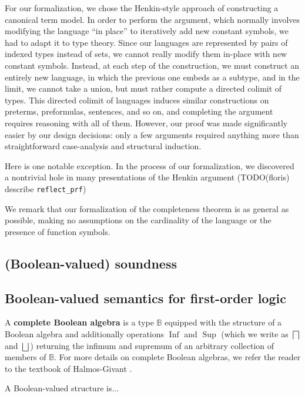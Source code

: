 \documentclass[a4paper,USenglish,cleveref, autoref]{lipics-v2019}
\newcommand{\B}{\mathbb{B}}
\begin{document}
For our formalization, we chose the Henkin-style approach of constructing a canonical term model. In order to perform the argument, which normally involves modifying the language ``in place'' to iteratively add new constant symbols, we had to adapt it to type theory. Since our languages are represented by pairs of indexed types instead of sets, we cannot really modify them in-place with new constant symbols. Instead, at each step of the construction, we must construct an entirely new language, in which the previous one embeds as a subtype, and in the limit, we cannot take a union, but must rather compute a directed colimit of types. This directed colimit of languages induces similar constructions on preterms, preformulas, sentences, and so on, and completing the argument requires reasoning with all of them. However, our proof was made significantly easier by our design decisions: only a few arguments required anything more than straightforward case-analysis and structural induction.

Here is one notable exception. In the process of our formalization, we discovered a nontrivial hole in many presentations of the Henkin argument (TODO(floris) describe \lstinline{reflect_prf})

We remark that our formalization of the completeness theorem is as general as possible, making no assumptions on the cardinality of the language or the presence of function symbols.

\subsection{(Boolean-valued) soundness}
\subsection{Boolean-valued semantics for first-order logic}

A \textbf{complete Boolean algebra} is a type $\B$ equipped with the structure of a Boolean algebra and additionally operations $\operatorname{Inf}$ and $\operatorname{Sup}$ (which we write as $\bigsqcap$ and $\bigsqcup$) returning the infimum and supremum of an arbitrary collection of members of $\B$. For more details on complete Boolean algebras, we refer the reader to the textbook of Halmos-Givant \cite{halmos-givant1}.

\begin{definition}\label{def-boolean-valued-structure}
  A Boolean-valued structure is...
\end{definition}
\end{document}
